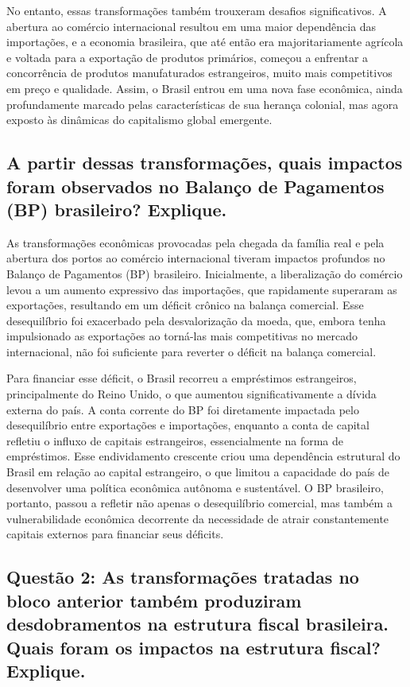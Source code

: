 \documentclass[a4paper,12pt]{article}[abntex2]
\begin{document}
No entanto, essas transformações também trouxeram desafios significativos. A abertura ao comércio internacional resultou em uma maior dependência das importações, e a economia brasileira, que até então era majoritariamente agrícola e voltada para a exportação de produtos primários, começou a enfrentar a concorrência de produtos manufaturados estrangeiros, muito mais competitivos em preço e qualidade. Assim, o Brasil entrou em uma nova fase econômica, ainda profundamente marcado pelas características de sua herança colonial, mas agora exposto às dinâmicas do capitalismo global emergente.

\subsection{\textbf{A partir dessas transformações, quais impactos foram observados no Balanço de Pagamentos (BP) brasileiro? Explique.}}

As transformações econômicas provocadas pela chegada da família real e pela abertura dos portos ao comércio internacional tiveram impactos profundos no Balanço de Pagamentos (BP) brasileiro. Inicialmente, a liberalização do comércio levou a um aumento expressivo das importações, que rapidamente superaram as exportações, resultando em um déficit crônico na balança comercial. Esse desequilíbrio foi exacerbado pela desvalorização da moeda, que, embora tenha impulsionado as exportações ao torná-las mais competitivas no mercado internacional, não foi suficiente para reverter o déficit na balança comercial.

Para financiar esse déficit, o Brasil recorreu a empréstimos estrangeiros, principalmente do Reino Unido, o que aumentou significativamente a dívida externa do país. A conta corrente do BP foi diretamente impactada pelo desequilíbrio entre exportações e importações, enquanto a conta de capital refletiu o influxo de capitais estrangeiros, essencialmente na forma de empréstimos. Esse endividamento crescente criou uma dependência estrutural do Brasil em relação ao capital estrangeiro, o que limitou a capacidade do país de desenvolver uma política econômica autônoma e sustentável. O BP brasileiro, portanto, passou a refletir não apenas o desequilíbrio comercial, mas também a vulnerabilidade econômica decorrente da necessidade de atrair constantemente capitais externos para financiar seus déficits.

\subsection{\textbf{Questão 2: As transformações tratadas no bloco anterior também produziram desdobramentos na estrutura fiscal brasileira. Quais foram os impactos na estrutura fiscal? Explique.}}
\end{document}
